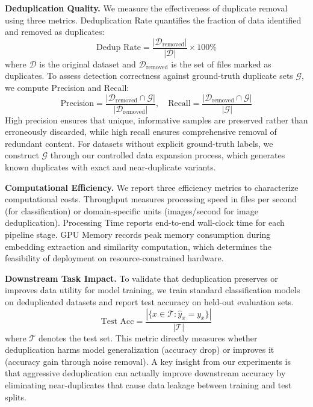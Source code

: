 \documentclass[sigconf, nonacm]{acmart}
\begin{document}
\textbf{Deduplication Quality.} We measure the effectiveness of duplicate removal using three metrics. Deduplication Rate quantifies the fraction of data identified and removed as duplicates:
\begin{equation}
\text{Dedup Rate} = \frac{|\mathcal{D}_{\text{removed}}|}{|\mathcal{D}|} \times 100\%
\end{equation}
where $\mathcal{D}$ is the original dataset and $\mathcal{D}_{\text{removed}}$ is the set of files marked as duplicates. To assess detection correctness against ground-truth duplicate sets $\mathcal{G}$, we compute Precision and Recall:
\begin{equation}
\text{Precision} = \frac{|\mathcal{D}_{\text{removed}} \cap \mathcal{G}|}{|\mathcal{D}_{\text{removed}}|}, \quad
\text{Recall} = \frac{|\mathcal{D}_{\text{removed}} \cap \mathcal{G}|}{|\mathcal{G}|}
\end{equation}
High precision ensures that unique, informative samples are preserved rather than erroneously discarded, while high recall ensures comprehensive removal of redundant content. For datasets without explicit ground-truth labels, we construct $\mathcal{G}$ through our controlled data expansion process, which generates known duplicates with exact and near-duplicate variants.

\textbf{Computational Efficiency.} We report three efficiency metrics to characterize computational costs. Throughput measures processing speed in files per second (for classification) or domain-specific units (images/second for image deduplication). Processing Time reports end-to-end wall-clock time for each pipeline stage. GPU Memory records peak memory consumption during embedding extraction and similarity computation, which determines the feasibility of deployment on resource-constrained hardware.

\textbf{Downstream Task Impact.} To validate that deduplication preserves or improves data utility for model training, we train standard classification models on deduplicated datasets and report test accuracy on held-out evaluation sets.
\begin{equation}
\text{Test Acc} = \frac{|\{x \in \mathcal{T} : \hat{y}_x = y_x\}|}{|\mathcal{T}|}
\end{equation}
where $\mathcal{T}$ denotes the test set. This metric directly measures whether deduplication harms model generalization (accuracy drop) or improves it (accuracy gain through noise removal). A key insight from our experiments is that aggressive deduplication can actually improve downstream accuracy by eliminating near-duplicates that cause data leakage between training and test splits.
\end{document}
